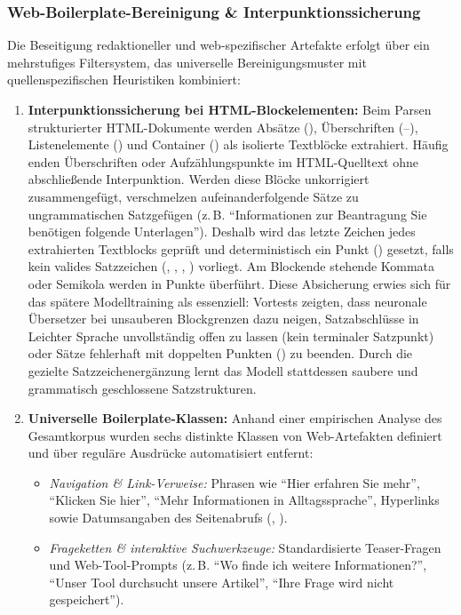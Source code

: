 \subsubsection{Web-Boilerplate-Bereinigung \& Interpunktionssicherung}
Die Beseitigung redaktioneller und web-spezifischer Artefakte erfolgt über ein mehrstufiges Filtersystem, das universelle Bereinigungsmuster mit quellenspezifischen Heuristiken kombiniert:

\begin{enumerate}
    \item \textbf{Interpunktionssicherung bei HTML-Blockelementen:} Beim Parsen strukturierter HTML-Dokumente werden Absätze (), Überschriften (--), Listenelemente () und Container () als isolierte Textblöcke extrahiert. Häufig enden Überschriften oder Aufzählungspunkte im HTML-Quelltext ohne abschließende Interpunktion. Werden diese Blöcke unkorrigiert zusammengefügt, verschmelzen aufeinanderfolgende Sätze zu ungrammatischen Satzgefügen (z.\,B. \enquote{Informationen zur Beantragung Sie benötigen folgende Unterlagen}). Deshalb wird das letzte Zeichen jedes extrahierten Textblocks geprüft und deterministisch ein Punkt () gesetzt, falls kein valides Satzzeichen (, \code{!}, , \code{:}) vorliegt. Am Blockende stehende Kommata oder Semikola werden in Punkte überführt. Diese Absicherung erwies sich für das spätere Modelltraining als essenziell: Vortests zeigten, dass neuronale Übersetzer bei unsauberen Blockgrenzen dazu neigen, Satzabschlüsse in Leichter Sprache unvollständig offen zu lassen (kein terminaler Satzpunkt) oder Sätze fehlerhaft mit doppelten Punkten () zu beenden. Durch die gezielte Satzzeichenergänzung lernt das Modell stattdessen saubere und grammatisch geschlossene Satzstrukturen.
    \item \textbf{Universelle Boilerplate-Klassen:} Anhand einer empirischen Analyse des Gesamtkorpus wurden sechs distinkte Klassen von Web-Artefakten definiert und über reguläre Ausdrücke automatisiert entfernt:
    \begin{itemize}
        \item \textit{Navigation \& Link-Verweise:} Phrasen wie \enquote{Hier erfahren Sie mehr}, \enquote{Klicken Sie hier}, \enquote{Mehr Informationen in Alltagssprache}, Hyperlinks sowie Datumsangaben des Seitenabrufs (, ).
        \item \textit{Frageketten \& interaktive Suchwerkzeuge:} Standardisierte Teaser-Fragen und Web-Tool-Prompts (z.\,B. \enquote{Wo finde ich weitere Informationen?}, \enquote{Unser Tool durchsucht unsere Artikel}, \enquote{Ihre Frage wird nicht gespeichert}).

\end{itemize}
\end{enumerate}
